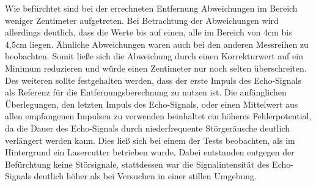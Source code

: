 Wie befürchtet sind bei der errechneten Entfernung Abweichungen im Bereich weniger Zentimeter aufgetreten. Bei Betrachtung der Abweichungen wird allerdings deutlich, dass die Werte bis auf einen, alle im Bereich von 4cm bis 4,5cm liegen. Ähnliche Abweichungen waren auch bei den anderen Messreihen zu beobachten. Somit ließe sich die Abweichung durch einen Korrekturwert auf ein Minimum reduzieren und würde einen Zentimeter nur noch selten überschreiten. Des weiteren sollte festgehalten werden, dass der erste Impuls des Echo-Signals als Referenz für die Entfernungsberechnung zu nutzen ist. Die anfänglichen Überlegungen, den letzten Impuls des Echo-Signals, oder einen Mittelwert aus allen empfangenen Impulsen zu verwenden beinhaltet ein höheres Fehlerpotential, da die Dauer des Echo-Signals durch niederfrequente Störgeräusche deutlich verlängert werden kann. Dies ließ sich bei einem der Tests beobachten, als im Hintergrund ein Lasercutter betrieben wurde. Dabei entstanden entgegen der Befürchtung keine Störsignale, stattdessen war die Signalintensität des Echo-Signals deutlich höher als bei Versuchen in einer stillen Umgebung. 





